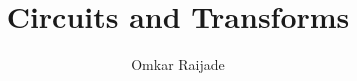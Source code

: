 \documentclass[journal,12pt,twocolumn]{IEEEtran}
\begin{document}
	\let\StandardTheFigure\thefigure
	\renewcommand{\thefigure}{\theproblem}
	
	
	
	\def\putbox#1#2#3{\makebox[0in][l]{\makebox[#1][l]{}\raisebox{\baselineskip}[0in][0in]{\raisebox{#2}[0in][0in]{#3}}}}
	\def\rightbox#1{\makebox[0in][r]{#1}}
	\def\centbox#1{\makebox[0in]{#1}}
	\def\topbox#1{\raisebox{-\baselineskip}[0in][0in]{#1}}
	\def\midbox#1{\raisebox{-0.5\baselineskip}[0in][0in]{#1}}
	
	\vspace{3cm}
	
	\title{ 
		Circuits and Transforms
	}
	
	
	
	\author{ Omkar Raijade %
	
}
% 
%
\end{document}
